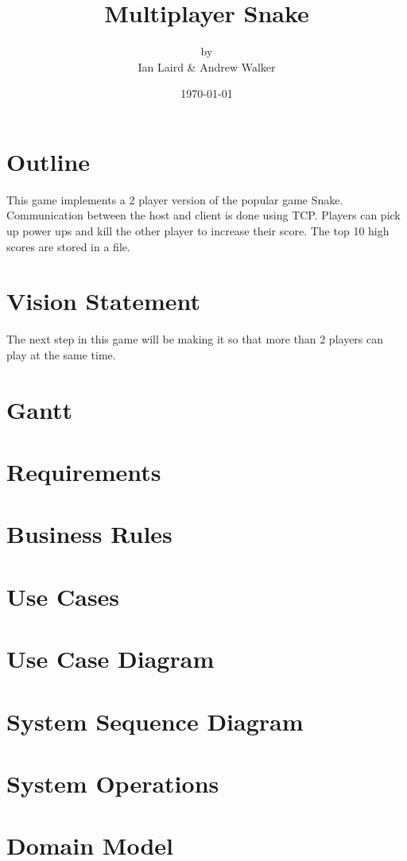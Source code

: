 \documentclass[titlepage]{article}
\title{{\Huge Multiplayer Snake}}
\date{\today}
\author{by\\{\large Ian Laird \& Andrew Walker}}
\begin{document}
	\maketitle
	\section{Outline}
	This game implements a 2 player version of the popular game Snake. Communication between the host and client is done using TCP. Players can pick up power ups and kill the other player to increase their score. The top 10 high scores are stored in a file.
	
	\section{Vision Statement}
	The next step in this game will be making it so that more than 2 players can play at the same time.
	
	\section{Gantt}
	
	\section{Requirements}
	
	\section{Business Rules}
	
	\section{Use Cases}
	
	\section{Use Case Diagram}
	
	\section{System Sequence Diagram}
	
	\section{System Operations}
	
	\section{Domain Model}
	
\end{document}

